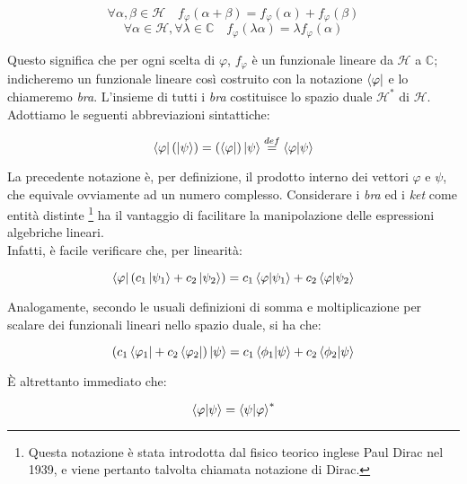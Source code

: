 	\begin{equation}
		\forall \alpha, \beta \in \mathcal{H} \quad f_{\varphi}(\alpha + \beta) = f_{\varphi}(\alpha) + f_{\varphi}(\beta)
	\end{equation}
	\begin{equation}
		\forall \alpha \in \mathcal{H},  \forall \lambda \in \mathbb{C} \quad f_{\varphi}(\lambda \alpha) = \lambda f_{\varphi}(\alpha)
	\end{equation}

Questo significa che per ogni scelta di $\varphi$, $f_{\varphi}$ è un funzionale lineare da $\mathcal{H}$ a $\mathbb{C}$; indicheremo un funzionale lineare così costruito con la notazione $\bra{\varphi}$ e lo chiameremo \textit{bra}. L'insieme di tutti i \textit{bra} costituisce lo spazio duale $\mathcal{H}^{*}$ di  $\mathcal{H}$. Adottiamo le seguenti abbreviazioni sintattiche:

	\begin{equation}
		\bra{\varphi}(\ket{\psi}) = (\bra{\varphi})\ket{\psi} \overset{def}{=} \braket{\varphi}{\psi}
	\end{equation}

La precedente notazione è, per definizione, il prodotto interno dei vettori $\varphi$ e $\psi$, che equivale ovviamente ad un numero complesso. Considerare i \textit{bra} ed i \textit{ket} come entità distinte \footnote{Questa notazione è stata introdotta dal fisico teorico inglese Paul Dirac nel 1939, e viene pertanto talvolta chiamata notazione di Dirac.} ha il vantaggio di facilitare la manipolazione delle espressioni algebriche lineari. \\
Infatti, è facile verificare che, per linearità:

	\begin{equation} \label{eq:linearityKets}
		\bra{\varphi}(c_1 \ket{\psi_1} + c_2 \ket{\psi_2}) = c_1 \braket{\varphi}{\psi_1} + c_2 \braket{\varphi}{\psi_2}
	\end{equation}

Analogamente, secondo le usuali definizioni di somma e moltiplicazione per scalare dei funzionali lineari nello spazio duale, si ha che:

	\begin{equation}
		(c_1 \bra{\varphi_1} + c_2 \bra{\varphi_2}) \ket{\psi} = c_1 \braket{\phi_1}{\psi} + c_2 \braket{\phi_2}{\psi}
	\end{equation}

È altrettanto immediato che:

	\begin{equation} \label{eq:conjugateBrakets}
		\braket{\varphi}{\psi} = \braket{\psi}{\varphi}^*
	\end{equation}

